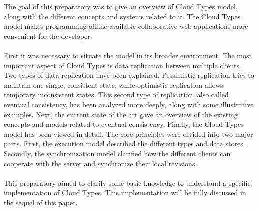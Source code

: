 \documentclass[a4paper,12pt]{report}
\begin{document}
The goal of this preparatory was to give an overview of Cloud Types model, along with the different concepts and systems related to it. The Cloud Types model makes programming offline available collaborative web applications more convenient for the developer.\\ 
\\
First it was necessary to situate the model in its broader environment. The most important aspect of Cloud Types is data replication between multiple clients. Two types of data replication have been explained. Pessimistic replication tries to maintain one single, consistent state, while optimistic replication allows temporary inconsistent states. This second type of replication, also called eventual consistency, has been analyzed more deeply, along with some illustrative examples. Next, the current state of the art gave an overview of the existing concepts and models related to eventual consistency. Finally, the Cloud Types model has been viewed in detail. The core principles were divided into two major parts. First, the execution model described the different types and data stores. Secondly, the synchronization model clarified how the different clients can cooperate with the server and synchronize their local revisions.\\ 
\\
This preparatory aimed to clarify some basic knowledge to understand a specific implementation of Cloud Types. This implementation will be fully discussed in the sequel of this paper.
\end{document}
